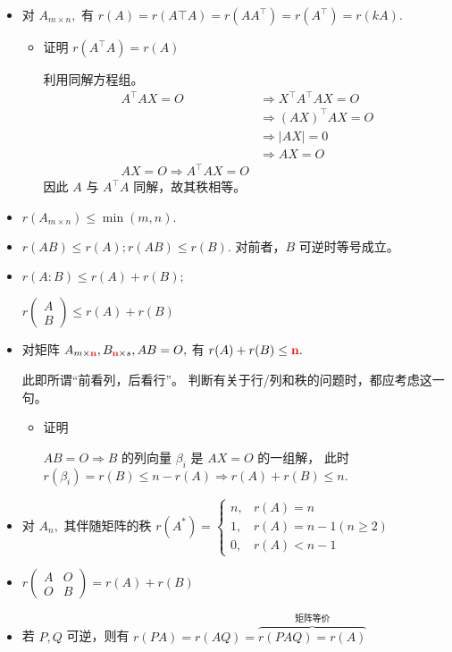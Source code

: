 \begin{itemize}
    \item 对 $ A_{m\times n}, $ 有 $ r(A) = r(A\top A) = r(AA^\top) = r(A^\top) = r(kA). $
    \begin{itemize}
        \item 证明 $ r(A^\top A) = r(A) $ 
        
        利用同解方程组。
        \begin{equation*}
            \begin{aligned}
                A^\top AX = O &\Rightarrow X^\top A^\top AX = O \\ 
                &\Rightarrow (AX)^\top AX = O \\ &\Rightarrow |AX| = 0
                \\ &\Rightarrow AX = O \\ 
                AX = O \Rightarrow A^\top AX = O
            \end{aligned}
        \end{equation*}
        因此 $ A $ 与 $ A^\top A $ 同解，故其秩相等。
    \end{itemize} 
    \item $ r(A_{m\times n})\leq \min(m,n). $ 
    \item $ r(AB) \leq r(A); r(AB) \leq r(B). $ 对前者，$ B $ 可逆时等号成立。
    \item $ r(A:B)\leq r(A) + r(B); $ 
    
    $ r(\begin{matrix}
        A \\ B 
    \end{matrix}) \leq r(A) + r(B)$ 
    \item 对矩阵 $ A_{m\times \textcolor{red}{\bf{n}}},B_{\textcolor{red}{\bf{n}}\times s}, AB=O, $
    有 $ r(A) + r(B) \leq \textcolor{red}{\bf{n}}. $ 
    
    此即所谓“前看列，后看行”。
    判断有关于行/列和秩的问题时，都应考虑这一句。
    \begin{itemize}
        \item 证明
        
        $AB = O \Rightarrow B $ 的列向量 $ \beta_i $ 是 $ AX=O $ 的一组解，
        此时 $ r(\beta_i) = r(B) \leq n - r(A) \Rightarrow r(A) + r(B) \leq n. $ 
    \end{itemize}
    \item 对 $ A_n, $ 其伴随矩阵的秩
    $ r(A^*)=\begin{cases}
        n,& r(A) = n\\ 1,&r(A) = n-1(n\geq 2)\\ 0,& r(A)< n-1
    \end{cases} $
    \item $ r\begin{pmatrix}
        A & O \\ O & B
    \end{pmatrix} = r(A) + r(B)$ 
    \item 若 $ P,Q $ 可逆，则有
    $ r(PA) = r(AQ) = \overbrace{r(PAQ) = r(A)}^{\textrm{矩阵等价}} $ 
    

\end{itemize}
